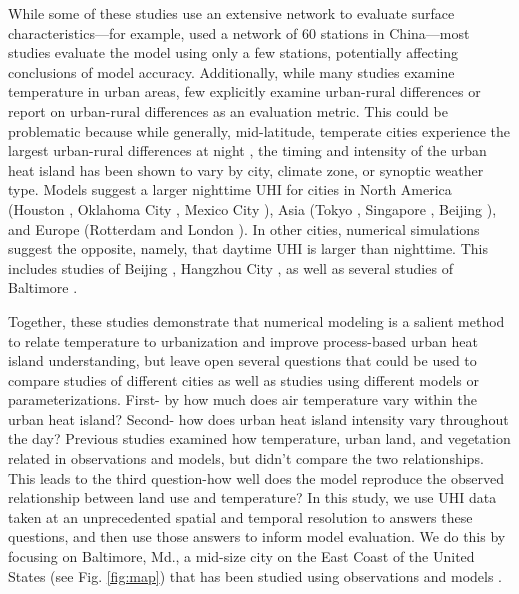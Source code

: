 \documentclass[draft,linenumbers]{agujournal}
\begin{document}
While some of these studies use an extensive network to evaluate surface characteristics---for example, \cite{miao2011impacts} used a network of 60 stations in China---most studies evaluate the model using only a few stations, potentially affecting conclusions of model accuracy. 
Additionally, while many studies examine temperature in urban areas, few explicitly examine urban-rural differences or report on urban-rural differences as an evaluation metric. This could be problematic because while generally, mid-latitude, temperate cities experience the largest urban-rural differences at night \citep{oke82,scott2018reduced}, the timing and intensity of the urban heat island has been shown to vary by city, climate zone, or synoptic weather type\cite{hardin2017urban}. 
Models suggest a larger nighttime UHI for cities in North America (Houston \citep{chen2011numerical}, Oklahoma City \citep{hu2013impact}, Mexico City \citep{cui2012seasonal}), Asia (Tokyo \citep{kusaka2012urban}, Singapore \cite{li2013multi}, Beijing \citep{wang2013contribution}), and Europe (Rotterdam \citep{theeuwes2014seasonal} and London \citep{grawe2013modelling}).
In other cities, numerical simulations suggest the opposite, namely, that daytime UHI is larger than nighttime. This includes studies of Beijing \citep{zhang2011impact}, Hangzhou City \citep{chen2014wrf}, as well as several studies of Baltimore \citep{zhang2011impact,li2013synergistic, li2015contrasting}.

Together, these studies demonstrate that numerical modeling is a salient method to relate temperature to urbanization and improve process-based urban heat island understanding, but leave open several questions that could be used to compare studies of different cities as well as studies using different models or parameterizations.
 First- by how much does air temperature vary within the urban heat island? Second- how does urban heat island intensity vary throughout the day? Previous studies examined how temperature, urban land, and vegetation related in observations and models, but didn't compare the two relationships. This leads to the third question-how well does the model reproduce the observed relationship between land use and temperature? 
 In this study, %
 we use UHI data taken at an unprecedented spatial and temporal resolution to answers these questions, and then use those answers to inform model evaluation. %
We do this by focusing on Baltimore, Md., a mid-size city on the East Coast of the United States (see Fig. \ref{fig:map}) that has been studied using observations \citep{Huang20111753,scott2017intraurban, scott2018reduced,brazel2000tale} and models \citep{zhang2011impact,li2013development,li2013synergistic,li2015contrasting}.  
\end{document}
